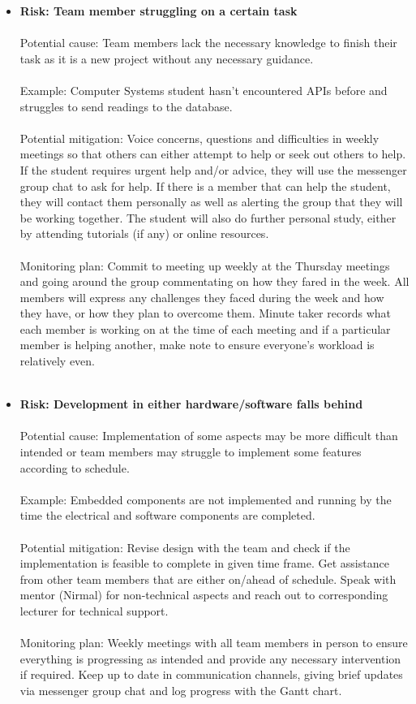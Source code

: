 \begin{itemize}
\item\textbf{Risk: Team member struggling on a certain task}
\\
\\ Potential cause: Team members lack the necessary knowledge to finish their task as it is a new project without any necessary guidance.
\\
\\ Example: Computer Systems student hasn't encountered APIs before and struggles to send readings to the database.
\\
\\ Potential mitigation: Voice concerns, questions and difficulties in weekly meetings so that others can either attempt to help or seek out others to help. If the student requires urgent help and/or advice, they will use the messenger group chat to ask for help. If there is a member that can help the student, they will contact them personally as well as alerting the group that they will be working together. The student will also do further personal study, either by attending tutorials (if any) or online resources.
\\
\\ Monitoring plan:
Commit to meeting up weekly at the Thursday meetings and going around the group commentating on how they fared in the week. All members will express any challenges they faced during the week and how they have, or how they plan to overcome them. Minute taker records what each member is working on at the time of each meeting and if a particular member is helping another, make note to ensure everyone’s workload is relatively even.
\\
\\

\item\textbf{Risk: Development in either hardware/software falls behind}
\\
\\ Potential cause: Implementation of some aspects may be more difficult than intended or team members may struggle to implement some features according to schedule.
\\
\\ Example: Embedded components are not implemented and running by the time the electrical and software components are completed.
\\
\\ Potential mitigation: Revise design with the team and check if the implementation is feasible to complete in given time frame. Get assistance from other team members that are either on/ahead of schedule. Speak with mentor (Nirmal) for non-technical aspects and reach out to corresponding lecturer for technical support.
\\
\\ Monitoring plan: Weekly meetings with all team members in person to ensure everything is progressing as intended and provide any necessary intervention if required. Keep up to date in communication channels, giving brief updates via messenger group chat and log progress with the Gantt chart.
\\
\\


\end{itemize}
